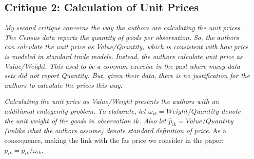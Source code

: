 \documentclass[a4paper,12pt]{article}
\begin{document}


\subsection{Critique 2: Calculation of Unit Prices}

\textit{My second critique concerns the way the authors are calculating the unit prices.
The Census data reports the quantity of goods per observation. So, the authors
can calculate the unit price as Value/Quantity, which is consistent with how
price is modeled in standard trade models. Instead, the authors calculate unit
price as Value/Weight. This used to be a common exercise in the past where
many data-sets did not report Quantity. But, given their data, there is no
justification for the authors to calculate the prices this way.}

\textit{Calculating the unit price as Value/Weight presents the authors
with an additional endogenity problem. To elaborate, let $\omega_{ik} = Weight/Quantity$
denote the unit weight of the goods in observation $ik$. Also let $\widehat{p}_{ik} = Value/Quantity$
(unlike what the authors assume) denote standard definition of price}. As a consequence, making the link with the fas price we consider in the paper: $\widetilde{p}_{ik} = \widehat{p}_{ik} / \omega_{ik}$.
\end{document}
